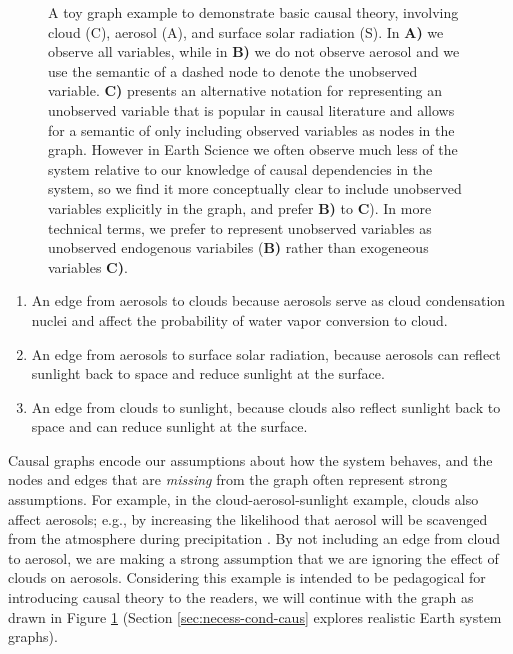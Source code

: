 \documentclass[12pt]{article}
\begin{document}
\begin{figure}
  \scalebox{1.0}{}
  \caption{A toy graph example to demonstrate basic causal theory,
    involving cloud (C), aerosol (A), and surface solar radiation
    (S). In \textbf{A)} we observe all variables, while in \textbf{B)}
    we do not observe aerosol and we use the semantic of a dashed node
    to denote the unobserved variable. \textbf{C)} presents an
    alternative notation for representing an unobserved variable that
    is popular in causal literature \citep[e.g.,][]{shpitser2006} and
    allows for a semantic of only including observed variables as
    nodes in the graph. However in Earth Science we often observe much
    less of the system relative to our knowledge of causal
    dependencies in the system, so we find it more conceptually clear
    to include unobserved variables explicitly in the graph, and
    prefer \textbf{B)} to \textbf{C}). In more technical terms, we
    prefer to represent unobserved variables as unobserved endogenous
    variabiles (\textbf{B)} rather than exogeneous variables
    \textbf{C)}.}
  \label{fig:toy}
\end{figure}

\begin{enumerate}
\item An edge from aerosols to clouds because aerosols serve as cloud
  condensation nuclei and affect the probability of water vapor
  conversion to cloud.
\item An edge from aerosols to surface solar radiation, because
  aerosols can reflect sunlight back to space and reduce sunlight
  at the surface.
\item An edge from clouds to sunlight, because clouds also reflect
  sunlight back to space and can reduce sunlight at the surface.
\end{enumerate}

Causal graphs encode our assumptions about how the system behaves, and
the nodes and edges that are \textit{missing} from the graph often
represent strong assumptions. For example, in the
cloud-aerosol-sunlight example, clouds also affect aerosols; e.g., by
increasing the likelihood that aerosol will be scavenged from the
atmosphere during precipitation
\citep[e.g.,][]{radke-scavenge-1980}. By not including an edge from
cloud to aerosol, we are making a strong assumption that we are
ignoring the effect of clouds on aerosols. Considering this example is
intended to be pedagogical for introducing causal theory to the
readers, we will continue with the graph as drawn in Figure
\ref{fig:toy} (Section \ref{sec:necess-cond-caus} explores realistic
Earth system graphs).
\end{document}
